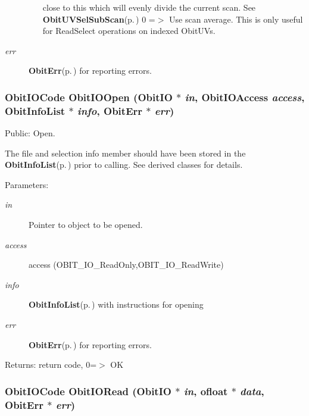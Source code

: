 \begin{Desc}
\begin{description}
\begin{itemize}
close to this which will evenly divide the current scan. See {\bf Obit\-UVSel\-Sub\-Scan}{\rm (p.\,\pageref{ObitUVSel_8c_a21})} 0 =$>$ Use scan average. This is only useful for Read\-Select operations on indexed Obit\-UVs. \end{itemize}
\item[{\em err}]{\bf Obit\-Err}{\rm (p.\,\pageref{structObitErr})} for reporting errors. \end{description}
\end{Desc}
\subsubsection{\setlength{\rightskip}{0pt plus 5cm}Obit\-IOCode Obit\-IOOpen ({\bf Obit\-IO} $\ast$ {\em in}, Obit\-IOAccess {\em access}, {\bf Obit\-Info\-List} $\ast$ {\em info}, {\bf Obit\-Err} $\ast$ {\em err})}\label{ObitIO_8h_a35}


Public: Open. 

The file and selection info member should have been stored in the {\bf Obit\-Info\-List}{\rm (p.\,\pageref{structObitInfoList})} prior to calling. See derived classes for details. \begin{Desc}
\item[Parameters:]
\begin{description}
\item[{\em in}]Pointer to object to be opened. \item[{\em access}]access (OBIT\_\-IO\_\-Read\-Only,OBIT\_\-IO\_\-Read\-Write) \item[{\em info}]{\bf Obit\-Info\-List}{\rm (p.\,\pageref{structObitInfoList})} with instructions for opening \item[{\em err}]{\bf Obit\-Err}{\rm (p.\,\pageref{structObitErr})} for reporting errors. \end{description}
\end{Desc}
\begin{Desc}
\item[Returns:]return code, 0=$>$ OK \end{Desc}
\subsubsection{\setlength{\rightskip}{0pt plus 5cm}Obit\-IOCode Obit\-IORead ({\bf Obit\-IO} $\ast$ {\em in}, {\bf ofloat} $\ast$ {\em data}, {\bf Obit\-Err} $\ast$ {\em err})}\label{ObitIO_8h_a38}


